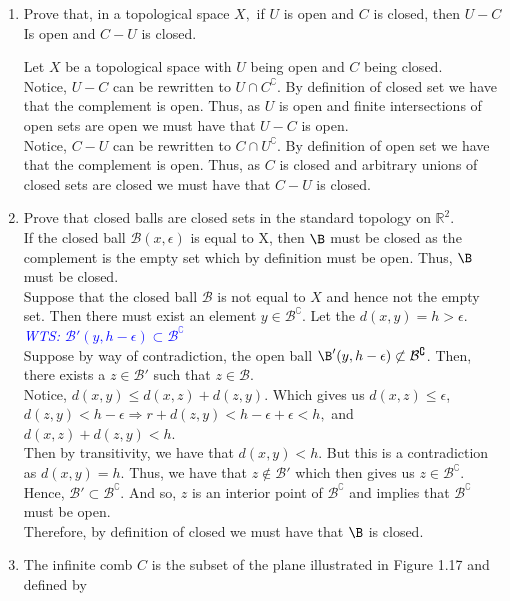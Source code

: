 \documentclass[12pt]{article}
\newcommand{\BB}{\mathcal{B}}
\newcommand{\wts}[1]{\textit{\textcolor{blue}{WTS: #1}}\\}
\newcommand{\pp}{\textit{\textcolor{yellow}{PP: }}}%
\begin{document}
	\begin{enumerate}
		
		\item[1.25] Prove that, in a topological space $X,$ if $U$ is open and $C$ is closed, then $U-C$ Is open and $C-U$ is closed.
		
		Let $ X $ be a topological space with $ U $ being open and $ C $ being closed.\\
		Notice, $ U-C $ can be rewritten to $ U\cap C^{\complement} $. By definition of closed set we have that the complement is open. Thus, as $ U $ is open and finite intersections of open sets are open we must have that $ U-C $ is open.\\
		Notice, $ C-U $ can be rewritten to $ C\cap U^{\complement} $. By definition of open set we have that the complement is open. Thus, as $ C $ is closed and arbitrary unions of closed sets are closed we must have that $ C-U $ is closed.
		\item[\pp1.26] Prove that closed balls are closed sets in the standard topology on $\mathbb{R}^{2}$.\\
		If the closed ball $ \BB(x,\epsilon)$ is equal to X, then $ \B $ must be closed as the complement is the empty set which by definition must be open. Thus, $ \B $ must be closed. \\
		Suppose that the closed ball $ \BB $ is not equal to $ X $ and hence not the empty set.
		Then there must exist an element $ y\in \BB^\complement $. Let the $ d(x,y) = h > \epsilon $.\\
		\wts{$\BB'(y,h-\epsilon) \subset \BB^\complement$}
		Suppose by way of contradiction, the open ball $\B'(y,h-\epsilon) \not\subset \BB^\complement$. Then, there exists a $ z\in \BB' $ such that $ z\in\BB $.\\
		Notice, $ d(x,y)\leq d(x,z)+d(z,y) $. Which gives us $ d(x,z)\leq \epsilon$, $d(z,y) < h-\epsilon \Rightarrow r+d(z,y)<h-\epsilon+\epsilon<h, $ and $ d(x,z)+d(z,y)<h$.\\
		Then by transitivity, we have that $d(x,y)<h$. But this is a contradiction as $d(x,y)=h$. Thus, we have that $ z \not\in \BB' $ which then gives us $ z\in \BB^\complement $. Hence, $ \BB' \subset \BB^\complement $. And so, $ z $ is an interior point of $ \BB^\complement $ and implies that $ \BB^\complement $ must be open.\\ Therefore, by definition of closed we must have that $ \B $ is closed.
		\item[\pp1.27] The infinite comb $C$ is the subset of the plane illustrated in Figure 1.17 and defined by

\end{enumerate}
\end{document}
